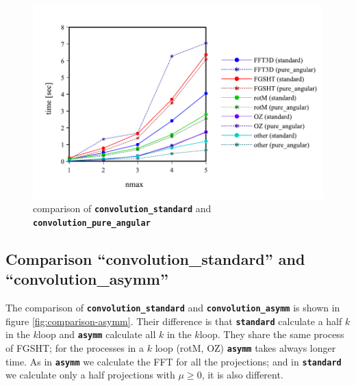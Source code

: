 \begin{figure}[H]
\begin{centering}
\includegraphics[bb=0bp 20bp 432bp 268bp,scale=0.6]{_figure/results/pure_angular}
\par\end{centering}
\caption{comparison of \texttt{\textbf{convolution\_standard}} and \texttt{\textbf{convolution\_pure\_angular\label{fig:comparison-pure_angular}}}}
\end{figure}


\subsection{Comparison ``convolution\_standard'' and ``convolution\_asymm''}

The comparison of \texttt{\textbf{convolution\_standard}} and \texttt{\textbf{convolution\_asymm}}
is shown in figure \ref{fig:comparison-asymm}. Their difference is
that \texttt{\textbf{standard}} calculate a half $k$ in the $k$loop
and \texttt{\textbf{asymm}} calculate all $k$ in the $k$loop. They
share the same process of FGSHT; for the processes in a $k$ loop
(rotM, OZ) \texttt{\textbf{asymm}} takes always longer time. As in
\texttt{\textbf{asymm}} we calculate the FFT for all the projections;
and in \texttt{\textbf{standard}} we calculate only a half projections
with $\mu\geq0$, it is also different.

